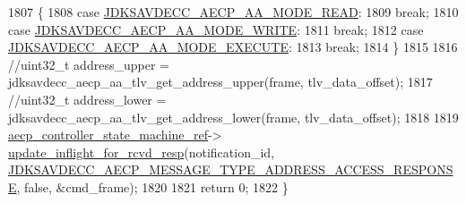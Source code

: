 \begin{DoxyCode}
1807     \{
1808     \textcolor{keywordflow}{case} \hyperlink{group___a_e_c_p___a_a__mode_ga5549ceff998a178693dfe5b191a45772}{JDKSAVDECC\_AECP\_AA\_MODE\_READ}:
1809         \textcolor{keywordflow}{break};
1810     \textcolor{keywordflow}{case} \hyperlink{group___a_e_c_p___a_a__mode_ga48146a7fbc4b80b2687845c1bae1fd02}{JDKSAVDECC\_AECP\_AA\_MODE\_WRITE}:
1811         \textcolor{keywordflow}{break};
1812     \textcolor{keywordflow}{case} \hyperlink{group___a_e_c_p___a_a__mode_gae5b812ef187fb4346f140e8f2e20c25e}{JDKSAVDECC\_AECP\_AA\_MODE\_EXECUTE}:
1813         \textcolor{keywordflow}{break};
1814     \}
1815 
1816     \textcolor{comment}{//uint32\_t address\_upper = jdksavdecc\_aecp\_aa\_tlv\_get\_address\_upper(frame, tlv\_data\_offset);}
1817     \textcolor{comment}{//uint32\_t address\_lower = jdksavdecc\_aecp\_aa\_tlv\_get\_address\_lower(frame, tlv\_data\_offset);}
1818 
1819     \hyperlink{namespaceavdecc__lib_a0b1b5aea3c0490f77cbfd9178af5be22}{aecp\_controller\_state\_machine\_ref}->
      \hyperlink{classavdecc__lib_1_1aecp__controller__state__machine_a997abd9786c330a5505e903e6443208e}{update\_inflight\_for\_rcvd\_resp}(notification\_id, 
      \hyperlink{group__aecp__message__type_ga4d8df21361c95f23016e03d0ef625dc0}{JDKSAVDECC\_AECP\_MESSAGE\_TYPE\_ADDRESS\_ACCESS\_RESPONSE}, \textcolor{keyword}{
      false}, &cmd\_frame);
1820 
1821     \textcolor{keywordflow}{return} 0;
1822 \}
\end{DoxyCode}


